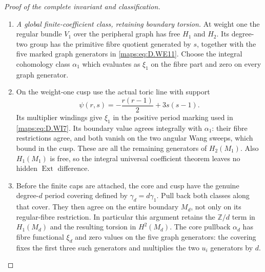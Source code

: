 \begin{proof}[Proof of the complete invariant and classification]
\begin{enumerate}[label=\arabic*.,leftmargin=*]
\item \emph{A global finite-coefficient class, retaining boundary torsion.}
At weight one the regular bundle $V_1$ over the peripheral
graph has free $H_1$ and $H_2$. Its degree-two group has the
primitive fibre quotient generated by $s$, together with the
five marked graph generators in \eqref{maps:eq:D.WE11}. Choose the integral
cohomology class $\alpha_1$ which evaluates as $\xi_1$ on the
fibre part and zero on every graph generator.

\item On the weight-one cusp use the actual toric line with support
\[
                 \psi(r,s)=-\frac{r(r-1)}2+3s(s-1).
 \tag{D.WI17}\label{maps:eq:D.WI17}
\]
Its multiplier windings give $\xi_1$ in the positive period
marking used in \eqref{maps:eq:D.WI7}. Its boundary value agrees integrally
with $\alpha_1$: their fibre restrictions agree, and both
vanish on the two angular Wang sweeps, which bound in the
cusp. These are all the remaining generators of $H_2(M_1)$.
Also $H_1(M_1)$ is free, so the integral universal coefficient
theorem leaves no hidden $\operatorname{Ext}$ difference.

\item Before the finite caps are attached, the core and cusp have
the genuine degree-$d$ period covering defined by
$\gamma_d=d\gamma_1$. Pull back both classes along that
cover. They then agree on the entire boundary $M_d$, not
only on its regular-fibre restriction. In particular this
argument retains the $\mathbb Z/d$ term in $H_1(M_d)$ and
the resulting torsion in $H^2(M_d)$. The core pullback
$\alpha_d$ has fibre functional $\xi_d$ and zero values on
the five graph generators: the covering fixes the first
three such generators and multiplies the two $u_i$ generators
by $d$.


\end{enumerate}
\end{proof}
